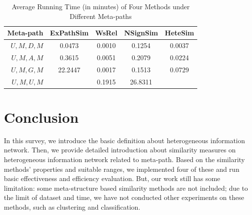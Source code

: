 \documentclass{acm_proc_article-csis8101}
\begin{document}
\begin{table}
\centering
\caption{Average Running Time (in minutes) of Four Methods under Different Meta-paths} 
\label{tab:efficiency}
\begin{tabular}{|r|c|c|c|c|} \hline
Meta-path & ExPathSim & WsRel & NSignSim & HeteSim \\ \hline
$U,M,D,M$ & 0.0473 & 0.0010 & 0.1254 & 0.0037 \\ \hline
$U,M,A,M$ & 0.3615 & 0.0051 & 0.2079 & 0.0224 \\ \hline
$U,M,G,M$ & 22.2447 & 0.0017 & 0.1513 & 0.0729 \\ \hline
$U,M,U,M$ &  & 0.1915 & 26.8311 &  \\ \hline
\end{tabular}
\end{table}

\section{Conclusion}

In this survey, we introduce the basic definition about heterogeneous information network. Then, we provide detailed introduction about similarity measures on heterogeneous information network related to meta-path. Based on the similarity methods' properties and suitable ranges, we implemented four of these and run basic effectiveness and efficiency evaluation. But, our work still has some limitation: some meta-structure based similarity methods \cite{huang2016meta} are not included; due to the limit of  dataset and time, we have not conducted other experiments on these methods, such as clustering and classification.
\end{document}
